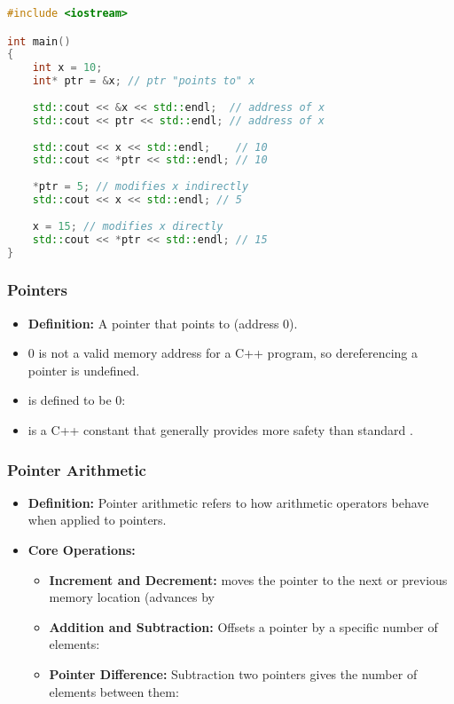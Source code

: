 \documentclass{article}
\begin{document}
\begin{lstlisting}[language=C++]
#include <iostream>

int main()
{
	int x = 10;
	int* ptr = &x; // ptr "points to" x
	
	std::cout << &x << std::endl;  // address of x
	std::cout << ptr << std::endl; // address of x
	
	std::cout << x << std::endl;    // 10
	std::cout << *ptr << std::endl; // 10
	
	*ptr = 5; // modifies x indirectly
	std::cout << x << std::endl; // 5
	
	x = 15; // modifies x directly
	std::cout << *ptr << std::endl; // 15
}
\end{lstlisting}

\subsubsection{ Pointers}

\begin{itemize}
	\item \textbf{Definition:} A pointer that points to  (address 0).
	\item 0 is not a valid memory address for a C++ program, so dereferencing a  pointer is undefined.
	\item {} is defined to be 0: 
	\item {} is a C++ constant that generally provides more safety than standard .
\end{itemize}

\subsubsection{Pointer Arithmetic}

\begin{itemize}
	\item \textbf{Definition:} Pointer arithmetic refers to how arithmetic operators behave when applied to pointers.
	\item \textbf{Core Operations:}
	\begin{itemize}
		\item \textbf{Increment and Decrement:} moves the pointer to the next or previous memory location (advances by 
		\item \textbf{Addition and Subtraction:} Offsets a pointer by a specific number of elements:
		\item \textbf{Pointer Difference:} Subtraction two pointers gives the number of elements between them:
	\end{itemize}
\end{itemize}
\end{document}
